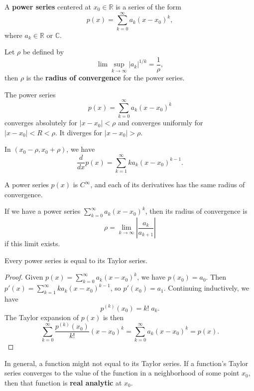 \documentclass[10pt]{report}
\begin{document}
\begin{defn}[]
A \textbf{power series} centered at $x_0 \in \mathbb{R}$ is a series of the form
\[
	p(x) = \sum_{k=0}^{\infty} a_k (x-x_0)^k,
\] where $a_k \in \mathbb{R} \text{ or } \mathbb{C}$.
\end{defn}

\begin{defn}[]
Let $\rho$ be defined by
\[
\lim \sup_{k \to \infty} |a_k|^{1/k} = \frac{1}{\rho},
\] then $\rho$ is the \textbf{radius of convergence} for the power series.
\end{defn}

\begin{thrm}[]
The power series
\[
	p(x) = \sum_{k=0}^{\infty} a_k (x-x_0)^k
\] converges absolutely for $|x-x_0|<\rho$ and converges uniformly for $|x-x_0| < R < \rho$. It diverges for $|x-x_0|>\rho$.
\end{thrm}

\begin{cor}
	In $(x_0-\rho, x_0+\rho)$, we have
	\[
		\frac{d }{d x} p(x) = \sum_{k=1}^{\infty} k a_k (x-x_0)^{k-1}.
	\] 
\end{cor}

\begin{cor}
	A power series $p(x)$ is $C^{\infty}$, and each of its derivatives has the same radius of convergence.
\end{cor}

\begin{thrm}[]
	If we have a power series $\sum_{k=0}^{\infty} a_k(x-x_0)^{k}$, then its radius of convergence is
	\[
	\rho = \lim_{k \to \infty} \left| \frac{a_k}{a_{k+1}}  \right|
	\] if this limit exists.
\end{thrm}

\begin{prop}
	Every power series is equal to its Taylor series.
\end{prop}
\begin{proof}
	Given $p(x) = \sum_{k=0}^{\infty} a_k (x-x_0)^k$, we have $p(x_0) = a_0$. Then $p'(x) = \sum_{k=1}^{\infty} k a_k (x-x_0)^{k-1}$, so $p'(x_0) = a_1$. Continuing inductively, we have
	\[
		p^{(k)}(x_0) = k! \; a_k.
	\] The Taylor expansion of $p(x)$ is then
	\[
		\sum_{k=0}^{\infty} \frac{p^{(k)}(x_0)}{k!} (x-x_0)^k = \sum_{k=0}^{\infty} a_k (x-x_0)^k = p(x).
	\]
\end{proof}

\begin{note}{}{}
	In general, a function might not equal to its Taylor series. If a function's Taylor series converges to the value of the function in a neighborhood of some point $x_0$, then that function is \textbf{real analytic} at $x_0$.
\end{note}
\end{document}
